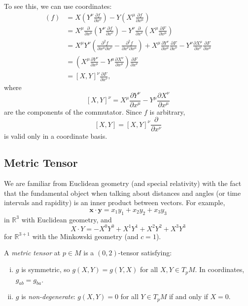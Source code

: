 \documentclass[12pt]{article}
\begin{document}
To see this, we can use coordinates:
\begin{align*}
	[X, Y](f) &= X \left( Y^\nu \frac{\partial f}{\partial x^\nu} \right) - Y \left( X^\mu \frac{\partial f}{\partial x^\mu} \right) \\
		  &= X^\mu \frac{\partial}{\partial x^\mu} \left( Y^\nu \frac{\partial f}{\partial x^\nu} \right) - Y^\nu \frac{\partial}{\partial x^\nu} \left( X^\mu \frac{\partial F}{\partial x^\mu} \right) \\
		  &= X^\mu Y^\nu \left( \frac{\partial^2 f}{\partial x^\mu \partial x^\nu} - \frac{\partial^2 f}{\partial x^\nu \partial x^\mu} \right) + X ^\mu \frac{\partial Y^\nu}{\partial x^\mu} \frac{\partial F}{\partial x^\nu} - Y^\nu \frac{\partial X^\mu}{\partial x^\nu} \frac{\partial F}{\partial x^\mu} \\
		  &= \left( X^\mu \frac{\partial Y^\nu}{\partial x^\mu} - Y^\mu \frac{\partial X^\nu}{\partial x^\mu} \right) \frac{\partial F}{\partial x^\nu} \\
		  &= [X, Y]^\nu \frac{\partial F}{\partial x^\nu},
\end{align*}
where
\[
	[X, Y]^\nu = X^\mu \frac{\partial Y^\nu}{\partial x^\mu} - Y^\mu \frac{\partial X^\nu}{\partial x^\mu}
\]
are the components of the commutator. Since $f$ is arbitrary,
\[
	[X, Y] = [X, Y]^\nu \frac{\partial}{\partial x^\nu}
\]
is valid only in a coordinate basis.

\subsection{Metric Tensor}%
\label{sub:met_tens}

We are familiar from Euclidean geometry (and special relativity) with the fact that the fundamental object when talking about distances and angles (or time intervals and rapidity) is an inner product between vectors. For example,
\[
\mathbf{x} \cdot \mathbf{y} = x_1 y_1 + x_2 y_2 + x_3 y_3
\]
in $\mathbb{R}^3$ with Euclidean geometry, and
\[
	X \cdot Y = - X^0 Y^0 + X^1 Y^1 + X^2 Y^2 + X^3 Y^3
\]
for $\mathbb{R}^{3 + 1}$ with the Minkowski geometry (and $c = 1$).

\begin{definition}
	A \emph{metric tensor} at $p \in M$ is a $(0, 2)$-tensor satisfying:
	\begin{enumerate}[(i)]
		\item $g$ is symmetric, so $g(X, Y) = g(Y, X)$ for all $X, Y \in T_pM$. In coordinates, $g_{ab} = g_{ba}$.
		\item $g$ is \emph{non-degenerate}: $g(X, Y) = 0$ for all $Y \in T_p M$ if and only if $X = 0$.
	\end{enumerate}
\end{definition}
\end{document}

